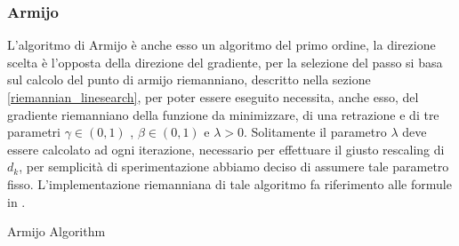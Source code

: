 \documentclass[a4paper, 12pt]{article}
\begin{document}
\subsubsection{Armijo}
L'algoritmo di Armijo è anche esso un algoritmo del primo ordine, la direzione scelta è l'opposta della direzione del gradiente, per la selezione del passo si basa sul calcolo del punto di armijo riemanniano, descritto nella sezione \ref{riemannian_linesearch}, per poter essere eseguito necessita, anche esso, del gradiente riemanniano della funzione da minimizzare, di una retrazione e di tre parametri $\gamma \in (0,1)$ , $\beta \in (0,1)$ e $\lambda > 0$. Solitamente il parametro $\lambda$ deve essere calcolato ad ogni iterazione, necessario per effettuare il giusto rescaling di $d_k$, per semplicità di sperimentazione abbiamo deciso di assumere tale parametro fisso. L'implementazione riemanniana di tale algoritmo fa riferimento alle formule in \cite{Iannazzo}.\\
\begin{center}
\begin{algorithm}[H]
\SetAlgoLined
{}
\caption{Armijo Algorithm}
\end{algorithm}
\end{center}
\end{document}
